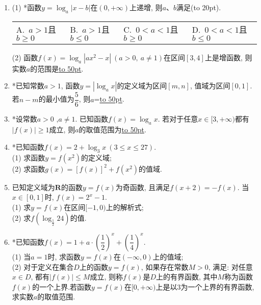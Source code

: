 \documentclass[10pt,a4paper]{article}
\newcommand{\blank}[1]{\underline{\hbox to #1pt{}}}
\newcommand{\bracket}[1]{(\hbox to #1pt{})}
\newcommand{\fourch}[4]{\par\begin{tabular}{p{.23\textwidth}p{.23\textwidth}p{.23\textwidth}p{.23\textwidth}}
A.~#1 &B.~#2& C.~#3& D.~#4
\end{tabular}}
\begin{document}
\begin{enumerate}[1.]
\\当$y=\ln x$时, 上述结论中, 正确结论的序号是\blank{50}.
\item (1) *函数$y=\log_a|x-b|$在$(0,+\infty)$上递增, 则$a$、$b$满足\bracket{20}.
\fourch{$a>1$且$b\ge 0$}{$a>1$且$b\le 0$}{$0<a<1$且$b\ge 0$}{$0<a<1$且$b\le 0$}
(2) 函数$f(x)=\log_a|ax^2-x| \ (a>0,\ a\ne 1)$在区间$[3,4]$上是增函数, 则实数$a$的范围是\blank{50}.
\item *已知常数$a>1$, 函数$y=|\log_ax|$的定义域为区间$[m,n]$, 值域为区间$[0,1]$. 若$n-m$的最小值为$\dfrac 56$, 则$a$=\blank{50}.
\item *设常数$a>0$ ,$a\ne 1$. 已知函数$f(x)=\log_ax$. 若对于任意$x\in [3,+\infty)$都有$|f(x)|\ge 1$成立, 则$a$的取值范围为\blank{50}.
\item *已知函数$f(x)=2+\log_3 x\ (3\le x\le 27)$.\\
(1) 求函数$y=f(x^2)$的定义域;\\
(2) 求函数$g(x)={[f(x)]}^2+f(x^2)$的值域.
\item 已知定义域为$\mathbf{R}$的函数$y=f(x)$为奇函数, 且满足$f(x+2)=-f(x)$. 当$x\in [0,1]$时, $f(x)=2^x-1$.\\
(1) 求$y=f(x)$在区间$[-1,0)$上的解析式;\\
(2) 求$f(\log_{\frac 12}24)$的值.
\item *已知函数$f(x)=1+a\cdot (\dfrac 12)^x+(\dfrac 14)^x$.\\
(1) 当$a=1$时, 求函数$y=f(x)$在$(-\infty,0)$上的值域;\\
(2) 对于定义在集合$D$上的函数$y=f(x)$, 如果存在常数$M>0$, 满足: 对任意$x\in D$, 都有$|f(x)|\le M$成立, 则称$f(x)$是$D$上的有界函数, 其中$M$称为函数$f(x)$的一个上界.若函数$y=f(x)$在$[0,+\infty)$上是以$3$为一个上界的有界函数, 求实数$a$的取值范围.


\end{enumerate}
\end{document}
